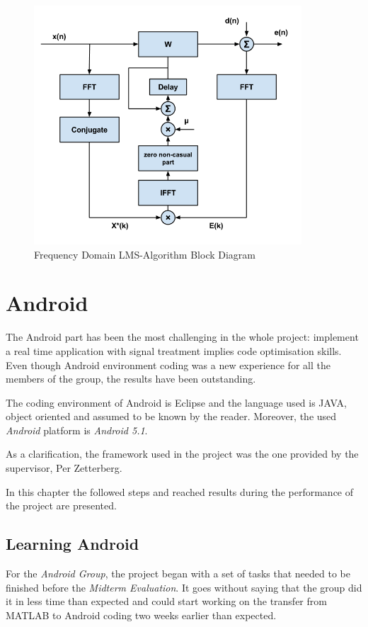 \documentclass[11pt,a4paper,english]{book}  %
\theoremstyle{definition}  %
\theoremstyle{plain}  %
\theoremstyle{remark}  %
\begin{document}
		\begin{figure}[h]
		\centering
		\includegraphics[width=10cm]{images/theory/freqlms.jpg}
		\caption{Frequency Domain LMS-Algorithm Block Diagram}
		\label{fig:freqlms}
		\end{figure}


\chapter{Android}

The Android part has been the most challenging in the whole project: implement a real time application with signal treatment implies code optimisation skills. Even though Android environment coding was a new experience for all the members of the group, the results have been outstanding.

The coding environment of Android is Eclipse and the language used is JAVA, object oriented and assumed to be known by the reader. Moreover, the used \textit{Android} platform is \textit{Android 5.1}. 

As a clarification, the framework used in the project was the one provided by the supervisor, Per Zetterberg.

In this chapter the followed steps and reached results during the performance of the project are presented. 

\section{Learning Android}

For the \textit{Android Group}, the project began with a set of tasks that needed to be finished before the \textit{Midterm Evaluation}. It goes without saying that the group did it in less time than expected and could start working on the transfer from MATLAB to Android coding two weeks earlier than expected.
\end{document}
